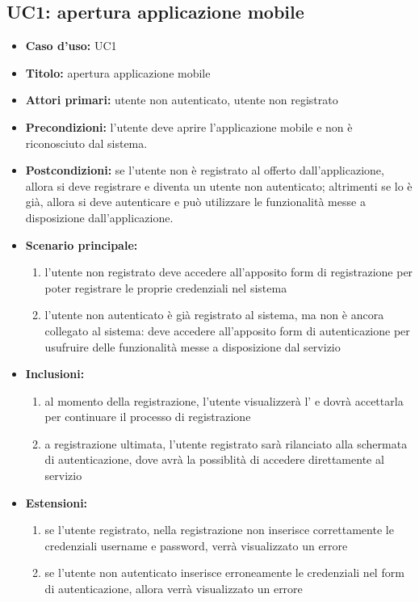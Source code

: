 ﻿\documentclass[../analisi-dei-requisiti]{subfiles}
\begin{document}
\subsection{UC1: apertura applicazione mobile}
\label{sub:uc1utente}


\begin{itemize}
  \item \textbf{Caso d’uso:} UC1 
  \item \textbf{Titolo:} apertura applicazione mobile
  \item \textbf{Attori primari:} utente non autenticato, utente non registrato
  \item \textbf{Precondizioni:} l'utente deve aprire l'applicazione mobile e non è riconosciuto dal sistema.
  \item \textbf{Postcondizioni:} se l'utente non è registrato al  offerto dall'applicazione, allora si deve registrare e diventa un utente non autenticato; 
  altrimenti se lo è già, allora si deve autenticare e può utilizzare le funzionalità messe a disposizione dall'applicazione. 
  \item \textbf{Scenario principale:} 
  \begin{enumerate}
    \item l'utente non registrato deve accedere all'apposito form di registrazione per poter registrare le proprie credenziali nel sistema
    \item l'utente non autenticato è già registrato al sistema, ma non è ancora collegato al sistema: deve accedere all'apposito form di autenticazione per usufruire delle funzionalità
    messe a disposizione dal servizio
  \end{enumerate}  
  \item \textbf{Inclusioni:} 
  \begin{enumerate}
    \item al momento della registrazione, l'utente visualizzerà l' e dovrà accettarla per continuare il processo di registrazione
    \item a registrazione ultimata, l'utente registrato sarà rilanciato alla schermata di autenticazione, dove avrà la possiblità di accedere direttamente al servizio
  \end{enumerate}  
  \item \textbf{Estensioni:} 
  \begin{enumerate}
    \item se l'utente registrato, nella registrazione non inserisce correttamente le credenziali username e password, verrà visualizzato un errore 
    \item se l'utente non autenticato inserisce erroneamente le credenziali nel form di autenticazione, allora verrà visualizzato un errore
  \end{enumerate}  
\end{itemize}
\end{document}

